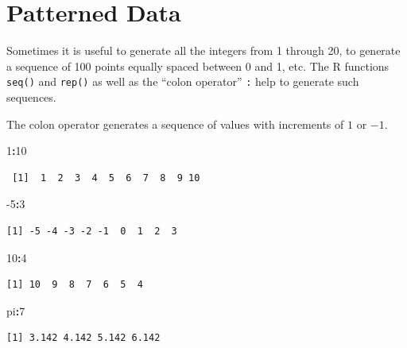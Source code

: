 \documentclass[
]{krantz}
\makeatletter
\newenvironment{Shaded}{\begin{snugshade}}{\end{snugshade}}
\newcommand{\DecValTok}[1]{\textcolor[rgb]{0.06,0.06,0.06}{#1}}
\newcommand{\NormalTok}[1]{#1}
\newcommand{\OperatorTok}[1]{\textcolor[rgb]{0.43,0.43,0.43}{\textbf{#1}}}
\newenvironment{kframe}{%
\medskip{}
\setlength{\fboxsep}{.8em}
 \def\at@end@of@kframe{}%
 \ifinner\ifhmode%
  \def\at@end@of@kframe{\end{minipage}}%
  \begin{minipage}{\columnwidth}%
 \fi\fi%
 \def\FrameCommand##1{\hskip\@totalleftmargin \hskip-\fboxsep
 \colorbox{shadecolor}{##1}\hskip-\fboxsep
     \hskip-\linewidth \hskip-\@totalleftmargin \hskip\columnwidth}%
 \MakeFramed {\advance\hsize-\width
   \@totalleftmargin\z@ \linewidth\hsize
   \@setminipage}}%
 {\par\unskip\endMakeFramed%
 \at@end@of@kframe}
\renewenvironment{Shaded}{\begin{kframe}}{\end{kframe}}
\makeatother
\begin{document}
\hypertarget{patterned-data}{%
\section{Patterned Data}\label{patterned-data}}

Sometimes it is useful to generate all the integers from 1 through 20, to generate a sequence of 100 points equally spaced between 0 and 1, etc. The R functions \texttt{seq()} and \texttt{rep()} as well as the ``colon operator'' \texttt{:} help to generate such sequences.

The colon operator generates a sequence of values with increments of \(1\) or \(-1\).

\begin{Shaded}
\begin{Highlighting}[]
\DecValTok{1}\OperatorTok{:}\DecValTok{10}
\end{Highlighting}
\end{Shaded}

\begin{verbatim}
 [1]  1  2  3  4  5  6  7  8  9 10
\end{verbatim}

\begin{Shaded}
\begin{Highlighting}[]
\DecValTok{{-}5}\OperatorTok{:}\DecValTok{3}
\end{Highlighting}
\end{Shaded}

\begin{verbatim}
[1] -5 -4 -3 -2 -1  0  1  2  3
\end{verbatim}

\begin{Shaded}
\begin{Highlighting}[]
\DecValTok{10}\OperatorTok{:}\DecValTok{4}
\end{Highlighting}
\end{Shaded}

\begin{verbatim}
[1] 10  9  8  7  6  5  4
\end{verbatim}

\begin{Shaded}
\begin{Highlighting}[]
\NormalTok{pi}\OperatorTok{:}\DecValTok{7}
\end{Highlighting}
\end{Shaded}

\begin{verbatim}
[1] 3.142 4.142 5.142 6.142
\end{verbatim}
\end{document}
